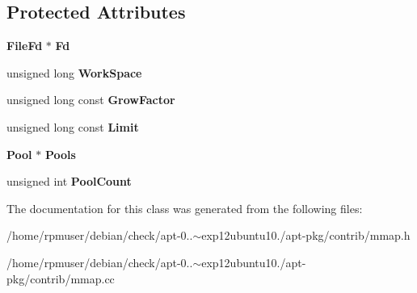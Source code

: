 \subsection*{\-Protected \-Attributes}
\begin{DoxyCompactItemize}
\item 
{\bf \-File\-Fd} $\ast$ {\bfseries \-Fd}\label{classDynamicMMap_a2d52c12bc66139451dca7d4c7cf3f02a}

\item 
unsigned long {\bfseries \-Work\-Space}\label{classDynamicMMap_a273fa6ca039025ec9c00e71a151704c4}

\item 
unsigned long const {\bfseries \-Grow\-Factor}\label{classDynamicMMap_a424afe2d1dbcf4c07e99263d23067c91}

\item 
unsigned long const {\bfseries \-Limit}\label{classDynamicMMap_a4df08c7857ad6dadf80e9c94f7980d96}

\item 
{\bf \-Pool} $\ast$ {\bfseries \-Pools}\label{classDynamicMMap_aff93882f4b3ecb59f12b8935659d13fb}

\item 
unsigned int {\bfseries \-Pool\-Count}\label{classDynamicMMap_a36e34398e81cd673816c2e92803b99d8}

\end{DoxyCompactItemize}


\-The documentation for this class was generated from the following files\-:\begin{DoxyCompactItemize}
\item 
/home/rpmuser/debian/check/apt-\/0..$\sim$exp12ubuntu10./apt-\/pkg/contrib/mmap.\-h\item 
/home/rpmuser/debian/check/apt-\/0..$\sim$exp12ubuntu10./apt-\/pkg/contrib/mmap.\-cc\end{DoxyCompactItemize}
